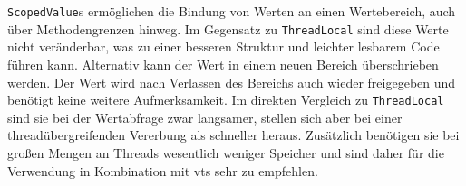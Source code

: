     \texttt{ScopedValue}s ermöglichen die Bindung von Werten an einen Wertebereich, auch über Methodengrenzen hinweg. Im Gegensatz zu \texttt{ThreadLocal} sind diese Werte nicht veränderbar, was zu einer 
    besseren Struktur und leichter lesbarem Code führen kann. Alternativ kann der Wert in einem neuen Bereich überschrieben werden. Der Wert wird nach Verlassen des Bereichs auch wieder freigegeben und
    benötigt keine weitere Aufmerksamkeit. Im direkten Vergleich zu \texttt{ThreadLocal} sind sie bei der Wertabfrage zwar langsamer, stellen sich aber bei einer threadübergreifenden Vererbung als schneller heraus.
    Zusätzlich benötigen sie bei großen Mengen an Threads wesentlich weniger Speicher und sind daher für die Verwendung in Kombination mit \Glspl{vt} sehr zu empfehlen. 